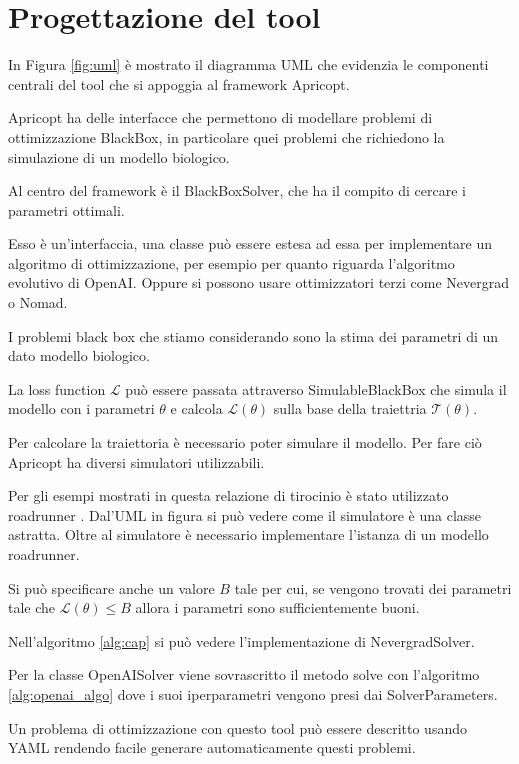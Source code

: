 \chapter{Progettazione del tool}

In Figura \ref{fig:uml} è mostrato il diagramma UML che evidenzia le componenti centrali del tool che si appoggia al framework Apricopt.

Apricopt ha delle interfacce che permettono di modellare problemi di ottimizzazione BlackBox, in particolare quei problemi che richiedono la simulazione di un modello biologico.

Al centro del framework è il BlackBoxSolver, che ha il compito di cercare i parametri ottimali.

Esso è un'interfaccia, una classe può essere estesa ad essa per implementare un algoritmo di ottimizzazione, per esempio per quanto riguarda l'algoritmo evolutivo di OpenAI. Oppure si possono usare ottimizzatori terzi come Nevergrad o Nomad.

I problemi black box che stiamo considerando sono la stima dei parametri di un dato modello biologico.

La loss function $\mathcal{L}$ 
può essere passata attraverso 
SimulableBlackBox che simula 
il modello con i parametri 
$ \theta $  e calcola 
$\mathcal{L}(\theta)$ sulla base della traiettria $\mathcal{T}(\theta)$.

Per calcolare la traiettoria è necessario poter simulare il modello. Per fare ciò Apricopt ha diversi simulatori utilizzabili.


Per gli esempi mostrati in questa relazione di tirocinio è stato utilizzato roadrunner \cite{welsh2023libroadrunner}. Dal'UML in figura si può vedere come 
il simulatore è una classe astratta. Oltre al simulatore è necessario implementare l'istanza di un modello roadrunner.

Si può specificare anche un valore $B$ tale per cui, se vengono trovati dei parametri tale che $\mathcal{L}(\theta) \leq B$ allora i parametri sono sufficientemente buoni.

Nell'algoritmo \ref{alg:cap} si può vedere l'implementazione di NevergradSolver.

Per la classe OpenAISolver viene sovrascritto il metodo solve con l'algoritmo \ref{alg:openai_algo} dove i suoi iperparametri vengono
presi dai SolverParameters.

Un problema di ottimizzazione con questo tool può essere descritto usando YAML rendendo facile generare automaticamente questi problemi.

